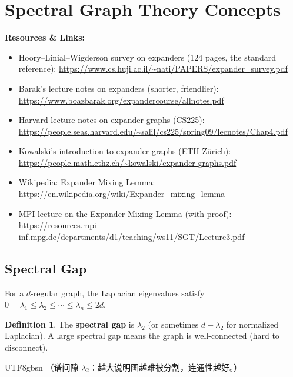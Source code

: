 \documentclass[12pt]{article}
\theoremstyle{definition}
\newtheorem{definition}[theorem]{Definition}
\theoremstyle{remark}
\newcommand{\resources}[1]{%
  \vspace{4pt}
  \noindent\colorbox{blue!8}{\parbox{\dimexpr\linewidth-2\fboxsep}{%
    \small\textbf{Resources \& Links:} #1}}
  \vspace{4pt}
}
\begin{document}
\section{Spectral Graph Theory Concepts}

\resources{
\begin{itemize}\setlength\itemsep{0pt}
  \item Hoory--Linial--Wigderson survey on expanders (124 pages, the standard reference):
        \url{https://www.cs.huji.ac.il/~nati/PAPERS/expander_survey.pdf}
  \item Barak's lecture notes on expanders (shorter, friendlier):
        \url{https://www.boazbarak.org/expandercourse/allnotes.pdf}
  \item Harvard lecture notes on expander graphs (CS225):
        \url{https://people.seas.harvard.edu/~salil/cs225/spring09/lecnotes/Chap4.pdf}
  \item Kowalski's introduction to expander graphs (ETH Z\"{u}rich):
        \url{https://people.math.ethz.ch/~kowalski/expander-graphs.pdf}
  \item Wikipedia: Expander Mixing Lemma:
        \url{https://en.wikipedia.org/wiki/Expander_mixing_lemma}
  \item MPI lecture on the Expander Mixing Lemma (with proof):
        \url{https://resources.mpi-inf.mpg.de/departments/d1/teaching/ws11/SGT/Lecture3.pdf}
\end{itemize}
}

\subsection{Spectral Gap}

For a $d$-regular graph, the Laplacian eigenvalues satisfy
$0 = \lambda_1 \le \lambda_2 \le \cdots \le \lambda_n \le 2d$.

\begin{definition}
The \textbf{spectral gap} is $\lambda_2$ (or sometimes $d - \lambda_2$ for normalized Laplacian).
A large spectral gap means the graph is well-connected (hard to disconnect).
\end{definition}

\begin{CJK}{UTF8}{gbsn}
（谱间隙 $\lambda_2$：越大说明图越难被分割，连通性越好。）
\end{CJK}
\end{document}
